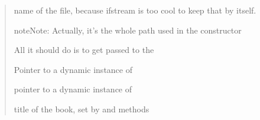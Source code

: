 \documentclass[letterpaper,10pt,english]{sphinxmanual}
\begin{document}
\begin{quote}
\begin{fulllineitems}
\end{fulllineitems}


\begin{fulllineitems}
\label{mobireader:mobireader::input_file_name__string}
name of the file, because ifstream is too cool to keep that by itself.

\begin{notice}{note}{Note:}
Actually, it's the whole path used in the constructor
\end{notice}

\end{fulllineitems}


\begin{fulllineitems}
\label{mobireader:mobireader::file__ifstreamP}
All it should do is to get passed to the {\hyperref[mobireader:mobireader::handler__header_handlerP]{}}

\end{fulllineitems}


\begin{fulllineitems}
\label{mobireader:mobireader::reader__compressionP}
Pointer to a dynamic instance of {\hyperref[compression:mobi::compression]{}}

\end{fulllineitems}


\begin{fulllineitems}
\label{mobireader:mobireader::handler__header_handlerP}
pointer to a dynamic instance of {\hyperref[header_handler:header_handler]{}}

\end{fulllineitems}


\begin{fulllineitems}
\label{mobireader:mobireader::title__cP}
title of the book,
set by
{\hyperref[mobireader:mobireader::set_title__cCP]{}} and {\hyperref[mobireader:set_default_title]{}} methods

\end{fulllineitems}

\end{quote}
\end{document}

